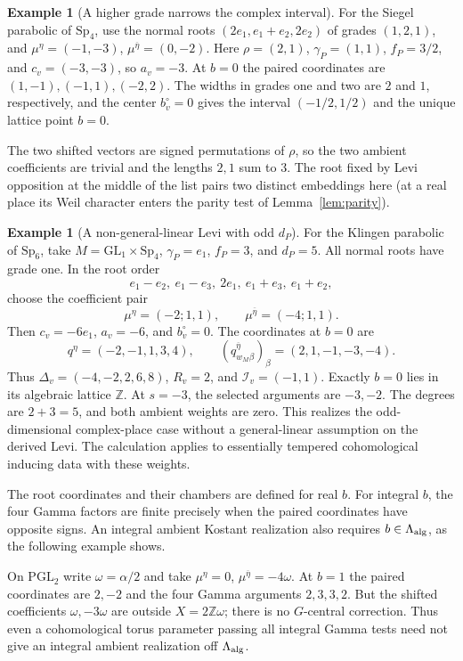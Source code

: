 \documentclass[12pt]{amsart}
\numberwithin{equation}{section}
\theoremstyle{plain}
\theoremstyle{definition}
\newtheorem{example}[theorem]{Example}
\theoremstyle{remark}
\renewcommand{\bar}{\overline}
\newcommand{\GL}{\mathrm{GL}}
\newcommand{\Sp}{\mathrm{Sp}}
\newcommand{\PGL}{\mathrm{PGL}}
\newcommand{\Z}{\mathbb{Z}}
\begin{document}
\begin{example}[A higher grade narrows the complex interval]\label{ex:sp4-complex}
For the Siegel parabolic of $\Sp_4$, use the normal roots $(2e_1,e_1+e_2,2e_2)$ of grades $(1,2,1)$, and $\mu^\eta=(-1,-3)$, $\mu^{\bar\eta}=(0,-2)$. Here $\rho=(2,1)$, $\gamma_P=(1,1)$, $f_P=3/2$, and $c_v=(-3,-3)$, so $a_v=-3$. At $b=0$ the paired coordinates are $(1,-1),(-1,1),(-2,2)$. The widths in grades one and two are $2$ and $1$, respectively, and the center $b_v^\circ=0$ gives the interval $(-1/2,1/2)$ and the unique lattice point $b=0$.

The two shifted vectors are signed permutations of $\rho$, so the two ambient coefficients are trivial and the lengths $2,1$ sum to $3$. The root fixed by Levi opposition at the middle of the list pairs two distinct embeddings here (at a real place its Weil character enters the parity test of Lemma~\ref{lem:parity}).
\end{example}

\begin{example}[A non-general-linear Levi with odd $d_P$] \label{ex:Sp6}
For the Klingen parabolic of $\Sp_6$, take $M=\GL_1\times\Sp_4$, $\gamma_P=e_1$, $f_P=3$, and $d_P=5$. All normal roots have grade one. In the root order
\[
 e_1-e_2,\ e_1-e_3,\ 2e_1,\ e_1+e_3,\ e_1+e_2,
\]
choose the coefficient pair
\[
 \mu^\eta=(-2;1,1),\qquad\mu^{\bar\eta}=(-4;1,1).
\]
Then $c_v=-6e_1$, $a_v=-6$, and $b_v^\circ=0$. The coordinates at $b=0$ are 
\[
 q^\eta=(-2,-1,1,3,4),\qquad
 (q^{\bar\eta}_{w_M\beta})_\beta=(2,1,-1,-3,-4).
\]
Thus $\Delta_v=(-4,-2,2,6,8)$, $R_v=2$, and $\mathcal I_v=(-1,1)$. Exactly $b=0$ lies in its algebraic lattice $\Z$. At $s=-3$, the selected arguments are $-3,-2$. The degrees are $2+3=5$, and both ambient weights are zero. This realizes the odd-dimensional complex-place case without a general-linear assumption on the derived Levi. The calculation applies to essentially tempered cohomological inducing data with these weights. 
\end{example}

The root coordinates and their chambers are defined for real $b$. For integral $b$, the four Gamma factors are finite precisely when the paired coordinates have opposite signs. An integral ambient Kostant realization also requires $b\in\Lambda_{\rm alg}$, as the following example shows. 

On $\PGL_2$ write $\omega=\alpha/2$ and take $\mu^\eta=0$, $\mu^{\bar\eta}=-4\omega$. At $b=1$ the paired coordinates are $2,-2$ and the four Gamma arguments $2,3,3,2$. But the shifted coefficients $\omega,-3\omega$ are outside $X=2\Z\omega$; there is no $G$-central correction. Thus even a cohomological torus parameter passing all integral Gamma tests need not give an integral ambient realization off $\Lambda_{\rm alg}$.
\end{document}
